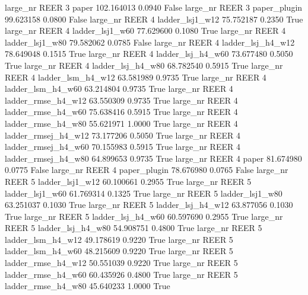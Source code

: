   large_nr     REER                 3               paper  102.164013      0.0940   False
  large_nr     REER                 3        paper_plugin   99.623158      0.0800   False
  large_nr     REER                 4     ladder_lsj1_w12   75.752187      0.2350    True
  large_nr     REER                 4     ladder_lsj1_w60   77.629600      0.1080    True
  large_nr     REER                 4     ladder_lsj1_w80   79.582062      0.0785   False
  large_nr     REER                 4   ladder_lsj_h4_w12   78.649048      0.1515    True
  large_nr     REER                 4   ladder_lsj_h4_w60   73.677480      0.5050    True
  large_nr     REER                 4   ladder_lsj_h4_w80   68.782540      0.5915    True
  large_nr     REER                 4   ladder_lsm_h4_w12   63.581989      0.9735    True
  large_nr     REER                 4   ladder_lsm_h4_w60   63.214804      0.9735    True
  large_nr     REER                 4  ladder_rmse_h4_w12   63.550309      0.9735    True
  large_nr     REER                 4  ladder_rmse_h4_w60   75.638416      0.5915    True
  large_nr     REER                 4  ladder_rmse_h4_w80   55.621971      1.0000    True
  large_nr     REER                 4 ladder_rmsej_h4_w12   73.177206      0.5050    True
  large_nr     REER                 4 ladder_rmsej_h4_w60   70.155983      0.5915    True
  large_nr     REER                 4 ladder_rmsej_h4_w80   64.899653      0.9735    True
  large_nr     REER                 4               paper   81.674980      0.0775   False
  large_nr     REER                 4        paper_plugin   78.676980      0.0765   False
  large_nr     REER                 5     ladder_lsj1_w12   60.100661      0.2955    True
  large_nr     REER                 5     ladder_lsj1_w60   61.769314      0.1325    True
  large_nr     REER                 5     ladder_lsj1_w80   63.251037      0.1030    True
  large_nr     REER                 5   ladder_lsj_h4_w12   63.877056      0.1030    True
  large_nr     REER                 5   ladder_lsj_h4_w60   60.597690      0.2955    True
  large_nr     REER                 5   ladder_lsj_h4_w80   54.908751      0.4800    True
  large_nr     REER                 5   ladder_lsm_h4_w12   49.178619      0.9220    True
  large_nr     REER                 5   ladder_lsm_h4_w60   48.215609      0.9220    True
  large_nr     REER                 5  ladder_rmse_h4_w12   50.551039      0.9220    True
  large_nr     REER                 5  ladder_rmse_h4_w60   60.435926      0.4800    True
  large_nr     REER                 5  ladder_rmse_h4_w80   45.640233      1.0000    True
